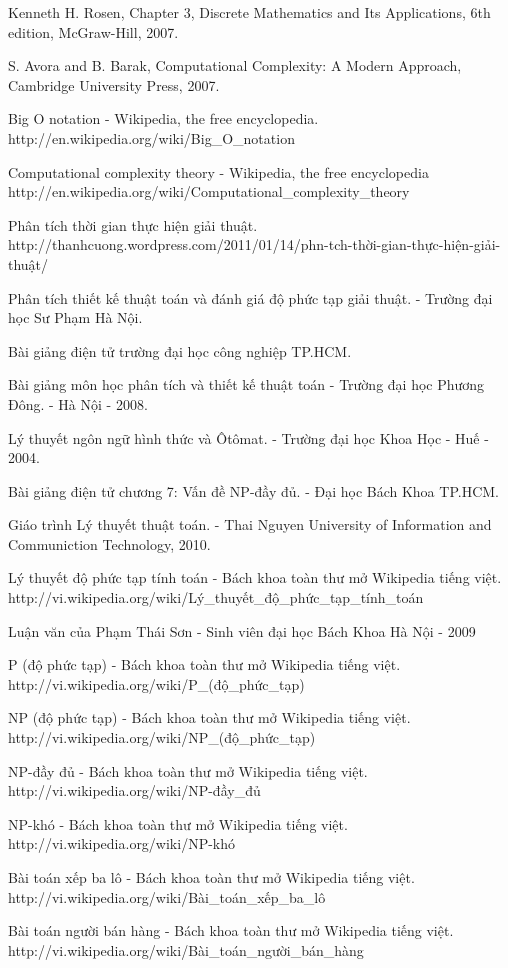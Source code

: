 \begin{thebibliography}{}
\bibitem{}
Kenneth H. Rosen, Chapter 3, Discrete Mathematics and Its Applications, 6th edition, McGraw-Hill, 2007.

\bibitem{}
S. Avora and B. Barak, Computational Complexity: A Modern Approach, Cambridge University Press, 2007.

\bibitem{}
Big O notation - Wikipedia, the free encyclopedia.
http://en.wikipedia.org/wiki/Big\_O\_notation

\bibitem{}
Computational complexity theory - Wikipedia, the free encyclopedia
http://en.wikipedia.org/wiki/Computational\_complexity\_theory

\bibitem{}
Phân tích thời gian thực hiện giải thuật.
http://thanhcuong.wordpress.com/2011/01/14/phn-tch-thời-gian-thực-hiện-giải-thuật/

Phân tích thiết kế thuật toán và đánh giá độ phức tạp giải thuật. - Trường đại học Sư Phạm Hà Nội.

\bibitem{}
Bài giảng điện tử trường đại học công nghiệp TP.HCM.

Bài giảng môn học phân tích và thiết kế thuật toán - Trường đại học Phương Đông. - Hà Nội - 2008.

\bibitem{}
Lý thuyết ngôn ngữ hình thức và Ôtômat. - Trường đại học Khoa Học - Huế - 2004.

\bibitem{}
Bài giảng điện tử chương 7: Vấn đề NP-đầy đủ. - Đại học Bách Khoa TP.HCM.

\bibitem{}
Giáo trình Lý thuyết thuật toán. - 
Thai Nguyen University of Information and Communiction Technology, 2010.

\bibitem{}
Lý thuyết độ phức tạp tính toán - Bách khoa toàn thư mở Wikipedia tiếng việt.
http://vi.wikipedia.org/wiki/Lý\_thuyết\_độ\_phức\_tạp\_tính\_toán

\bibitem{}
Luận văn của Phạm Thái Sơn - Sinh viên đại học Bách Khoa Hà Nội - 2009

\bibitem{}
P (độ phức tạp) - Bách khoa toàn thư mở Wikipedia tiếng việt.
http://vi.wikipedia.org/wiki/P\_(độ\_phức\_tạp)

\bibitem{}
NP (độ phức tạp) - Bách khoa toàn thư mở Wikipedia tiếng việt.
http://vi.wikipedia.org/wiki/NP\_(độ\_phức\_tạp)

\bibitem{}
NP-đầy đủ - Bách khoa toàn thư mở Wikipedia tiếng việt.
http://vi.wikipedia.org/wiki/NP-đầy\_đủ

\bibitem{}
NP-khó - Bách khoa toàn thư mở Wikipedia tiếng việt.
http://vi.wikipedia.org/wiki/NP-khó

Bài toán xếp ba lô - Bách khoa toàn thư mở Wikipedia tiếng việt.
http://vi.wikipedia.org/wiki/Bài\_toán\_xếp\_ba\_lô

Bài toán người bán hàng - Bách khoa toàn thư mở Wikipedia tiếng việt.
http://vi.wikipedia.org/wiki/Bài\_toán\_người\_bán\_hàng


\end{thebibliography}